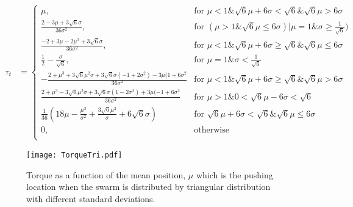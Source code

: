 \begin{strip}
\begin{align}
\tau_t &=  \left\{
\begin{array}{ll}
    \mu, &   \textrm{for     }\mu<1 \& \sqrt{6} \mu + 6 \sigma < \sqrt{6} \& \sqrt{6} \mu > 6 \sigma\\
    \frac{2-3\mu+3\sqrt{6}\sigma}{36\sigma^2}, & \textrm{for     } (\mu>1\&\sqrt{6}\mu \leq 6\sigma) | \mu =1 \& \sigma \geq \frac{1}{\sqrt{6}})\\
    \frac{-2+3\mu-2\mu^3+3\sqrt{6}\sigma}{36\sigma^2}, &   \textrm{for     } \mu<1 \& \sqrt{6}\mu+6\sigma\geq \sqrt{6} \& \sqrt{6} \mu \leq 6\sigma\\
    \frac{1}{2}-\frac{\sigma}{\sqrt{6}}, &   \textrm{for     } \mu = 1 \& \sigma < \frac{1}{\sqrt{6}}\\
    -\frac{2+\mu^3+3\sqrt{6}\mu^2\sigma+3\sqrt{6}\sigma(-1+2\sigma^2)-3\mu(1+6\sigma^2}{36\sigma^2} &  \textrm{for     } \mu<1 \& \sqrt{6} \mu + 6 \sigma \geq \sqrt{6} \& \sqrt{6} \mu > 6 \sigma\\
    \frac{2+\mu^3-3\sqrt{6}\mu^2\sigma+3\sqrt{6}\sigma(1-2\sigma^2)+3\mu(-1+6\sigma^2}{36\sigma^2} &  \textrm{for     } \mu>1 \& 0<\sqrt{6}\mu-6\sigma<\sqrt{6}\\
    \frac{1}{36}(18\mu-\frac{\mu^3}{\sigma^2} + \frac{3\sqrt{6}\mu^2}{\sigma}+6\sqrt{6}\sigma) &  \textrm{for     }  \sqrt{6} \mu+6\sigma<\sqrt{6}\&\sqrt{6}\mu\leq 6\sigma\\
     0, &  \textrm{otherwise}\\ 
\end{array} 
\right.
\end{align}
\end{strip}


\begin{figure}
\begin{center}
	\texttt{[image: TorqueTri.pdf]}
\end{center}
\vspace{-1em}
\caption{\label{fig:torqueTri}
Torque as a function of the mean position, $\mu$ which is the pushing location when the swarm is distributed by triangular distribution with different standard deviations.
}
\vspace{2em}
\end{figure}


